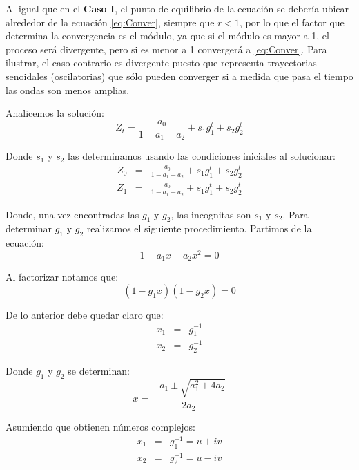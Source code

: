 \documentclass[
]{book}
\begin{document}
Al igual que en el \textbf{Caso I}, el punto de equilibrio de la ecuación se debería ubicar alrededor de la ecuación \eqref{eq:Conver}, siempre que \(r < 1\), por lo que el factor que determina la convergencia es el módulo, ya que si el módulo es mayor a 1, el proceso será divergente, pero si es menor a 1 convergerá a \eqref{eq:Conver}. Para ilustrar, el caso contrario es divergente puesto que representa trayectorias senoidales (oscilatorias) que sólo pueden converger si a medida que pasa el tiempo las ondas son menos amplias.

Analicemos la solución:
\begin{equation*}
    Z_t = \frac{a_0}{1 - a_1 - a_2} + s_1 g_1^t + s_2 g_2^t
\end{equation*}

Donde \(s_1\) y \(s_2\) las determinamos usando las condiciones iniciales al solucionar:
\begin{eqnarray*}
    Z_0 & = & \frac{a_0}{1 - a_1 - a_2} + s_1 g_1^t + s_2 g_2^t \\
    Z_1 & = & \frac{a_0}{1 - a_1 - a_2} + s_1 g_1^t + s_2 g_2^t 
\end{eqnarray*}

Donde, una vez encontradas las \(g_1\) y \(g_2\), las incognitas son \(s_1\) y \(s_2\). Para determinar \(g_1\) y \(g_2\) realizamos el siguiente procedimiento. Partimos de la ecuación:
\begin{equation*}
    1 - a_1 x - a_2 x^2 = 0
\end{equation*}

Al factorizar notamos que:
\begin{equation*}
    (1 - g_1 x)(1 - g_2 x) = 0
\end{equation*}

De lo anterior debe quedar claro que:
\begin{eqnarray*}
    x_1 & = & g_1^{-1} \\
    x_2 & = & g_2^{-1}
\end{eqnarray*}

Donde \(g_1\) y \(g_2\) se determinan:
\begin{equation*}
    x = \frac{-a_1 \pm \sqrt{a_1^2 + 4a_2}}{2 a_2}
\end{equation*}

Asumiendo que obtienen números complejos:
\begin{eqnarray*}
    x_1 & = & g_1^{-1} = u + iv  \\
    x_2 & = & g_2^{-1} = u - iv 
\end{eqnarray*}
\end{document}
